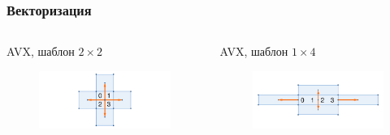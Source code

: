 \documentclass[presentation,18pt]{beamer}
\begin{document}
\begin{frame}[t]
	\label{vectorization}
	\frametitle{Векторизация}

	\begin{columns}

		\begin{block}{AVX, шаблон $2 \times 2$}
			\begin{figure}
				\includegraphics[width=\textwidth]{img/CropAVX2x2.png}
			\end{figure}
		\end{block}

		\begin{block}{AVX, шаблон $1 \times 4$}
			\begin{figure}
				\includegraphics[width=\textwidth]{img/CropAVX1x4.png}
			\end{figure}
		\end{block}


\end{columns}
\end{frame}
\end{document}
